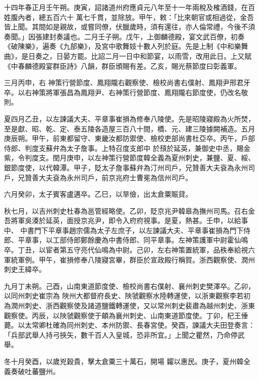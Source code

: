 \begin{pinyinscope}
 十四年春正月壬午朔。庚寅，詔諸道州府應貞元八年至十一年兩稅及榷酒錢，在百姓腹內者，總五百六十
 萬七千貫，並除放。甲午，敕：「比來朝官或相過從，金吾皆上聞。其間如是親故，或嘗同僚，伏臘歲時，須有還往，亦人倫常禮，今後不須奏聞。」因張建封奏議也。二月壬子朔。戊午，上御麟德殿，宴文武百僚，初奏《破陳樂》，遍奏《九部樂》，及宮中歌舞妓十數人列於庭。先是上制《中和樂舞曲》，是日奏之，日晏方罷。比詔二月一日中和節宴，以雨雪，改用此日。上又賦《中春麟德殿宴群臣詩》八韻，群臣頒賜有差。乙亥，賜光蔡節度曰彰義軍。



 三月丙申，右
 神策行營節度、鳳翔隴右觀察使、檢校尚書右僕射、鳳翔尹邢君牙卒。以右神策將軍張昌為鳳翔尹、右神策行營節度、鳳翔隴右節度使，仍改名敬則。



 夏四月乙丑，以左諫議大夫、平章事崔損為修奉八陵使。先是昭陵寢殿為火所焚，至是獻、昭、乾、定、泰五陵各造屋三百八十間，橋、元、建三陵據闕補造。五月庚辰朔。甲午，前東都留守、東畿汝都防禦使、檢校吏部尚書杜亞卒。丙午，戶部侍郎、判度支蘇弁為太子詹事。上特召度支郎中
 於䪹於延英，兼御史中丞，賜金紫，令判度支。閏月庚申，以左神策行營節度韓全義為夏州刺史，兼鹽、夏、綏、銀節度使，以代韓潭。甲子，貶太子詹事蘇弁為汀州司戶，兄贊善大夫袞為永州司戶，兄贊善大夫袞為永州司戶，前京兆府士曹冕為信州司戶。



 六月癸卯，太子賓客盧邁卒。乙巳，以旱儉，出太倉粟賑貸。



 秋七月，以吉州刺史杜春為邕管經略使。乙卯，貶京兆尹韓皋為撫州司馬。召右金吾將軍吳湊於延英，面授京兆尹，即令入府府視事。是夏，熱甚。壬申，以給事中、
 中書門下平章事趙宗儒為太子左庶子，以左諫議大夫、平章事崔損為門下侍郎、平章事，以工部侍郎鄭餘慶為中書侍郎、同平章事。左神策護軍中尉霍仙鳴卒。丁丑，以宦者第五守亮代仙鳴為中尉。己卯，左右神策置統軍，品秩奉給視六軍統軍例。甲午，崔損修奉八陵寢宮畢，群臣於宣政殿行稱賀。浙西觀察使、潤州刺史王緯卒。



 九月丁未朔。己酉，山南東道節度使、檢校尚書右僕射、襄州刺史樊澤卒。乙卯，以同州刺史崔宗為
 陜州大都督府長史、陜虢觀察水陸轉運使，以浙東觀察李若初為潤州刺史、浙西觀察使及諸道鹽鐵轉運使，又以常州刺史裴肅為越州刺史、浙東觀察使。丙辰，以陜虢觀察使于頔為襄州刺史、山南東道節度使。丁卯，杞王倕薨。以太常卿杜確為同州刺史、本州防禦、長春宮使。癸酉，諫議大夫田登奏言：「兵部武舉人持弓挾矢，數千百人入皇城，恐非所宜。」上聞之瞿然，乃命停武舉。



 冬十月癸酉，以歲兇穀貴，擊太倉粟三十萬石，開場
 糶以惠民。庚子，夏州韓全義奏破吐蕃鹽州。




\end{pinyinscope}
